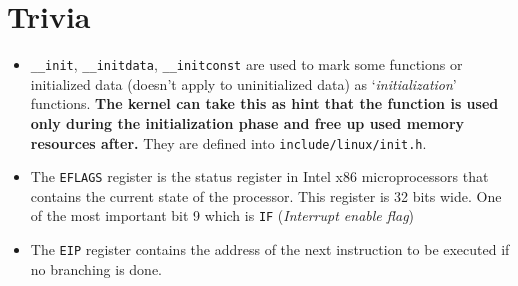 \documentclass[10pt,a4paper]{article}
\begin{document}
\section{Trivia}

\begin{itemize}
\item \texttt{\_\_init}, \texttt{\_\_initdata}, \texttt{\_\_initconst}	are used to mark some functions or initialized data	(doesn't apply to uninitialized data) as `\textit{initialization}' functions. \textbf{The kernel can take this as hint that the function is used only during the initialization phase and free up used memory resources after.} They are defined into \texttt{include/linux/init.h}.

\item The \texttt{EFLAGS} register is the status register in Intel x86 microprocessors that contains the current state of the processor. This register is 32 bits wide. One of the most important bit 9 which is \texttt{IF} (\textit{Interrupt enable flag}) 

\item The \texttt{EIP} register contains the address of the next instruction to be executed if no branching is done. 
\end{itemize}
\end{document}
